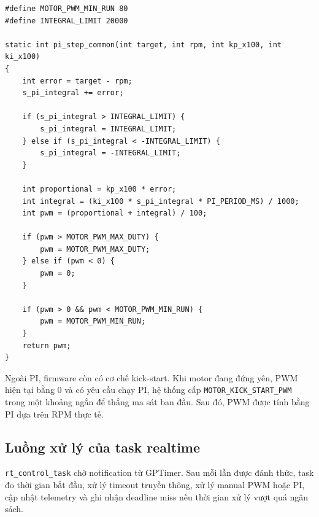 \documentclass[12pt,a4paper]{report}
\begin{document}
\begin{lstlisting}
#define MOTOR_PWM_MIN_RUN 80
#define INTEGRAL_LIMIT 20000

static int pi_step_common(int target, int rpm, int kp_x100, int ki_x100)
{
    int error = target - rpm;
    s_pi_integral += error;

    if (s_pi_integral > INTEGRAL_LIMIT) {
        s_pi_integral = INTEGRAL_LIMIT;
    } else if (s_pi_integral < -INTEGRAL_LIMIT) {
        s_pi_integral = -INTEGRAL_LIMIT;
    }

    int proportional = kp_x100 * error;
    int integral = (ki_x100 * s_pi_integral * PI_PERIOD_MS) / 1000;
    int pwm = (proportional + integral) / 100;

    if (pwm > MOTOR_PWM_MAX_DUTY) {
        pwm = MOTOR_PWM_MAX_DUTY;
    } else if (pwm < 0) {
        pwm = 0;
    }

    if (pwm > 0 && pwm < MOTOR_PWM_MIN_RUN) {
        pwm = MOTOR_PWM_MIN_RUN;
    }
    return pwm;
}
\end{lstlisting}

Ngoài PI, firmware còn có cơ chế kick-start. Khi motor đang đứng yên, PWM hiện tại bằng 0 và có yêu cầu chạy PI, hệ thống cấp \texttt{MOTOR\_KICK\_START\_PWM} trong một khoảng ngắn để thắng ma sát ban đầu. Sau đó, PWM được tính bằng PI dựa trên RPM thực tế.

\subsection{Luồng xử lý của task realtime}

\texttt{rt\_control\_task} chờ notification từ GPTimer. Sau mỗi lần được đánh thức, task đo thời gian bắt đầu, xử lý timeout truyền thông, xử lý manual PWM hoặc PI, cập nhật telemetry và ghi nhận deadline miss nếu thời gian xử lý vượt quá ngân sách.
\end{document}
